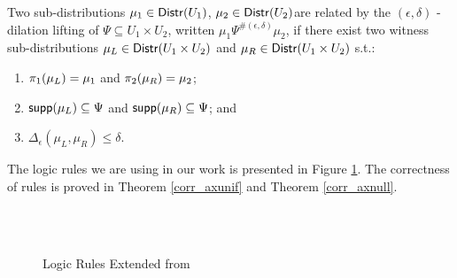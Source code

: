 \documentclass[a4paper,11pt]{article}
\begin{document}
\begin{defn}
Two sub-distributions $\mu_1 \in \mathsf{Distr}(U_1)$, $\mu_2 \in \mathsf{Distr}(U_2)$are
related by the $(\epsilon, \delta)$ - dilation lifting of $\Psi \subseteq U_1
\times U_2$, written $\mu_1 \Psi^{\#(\epsilon, \delta)} \mu_2$, if there exist
two witness sub-distributions $\mu_L \in \mathsf{Distr}(U_1 \times U_2)$ and $\mu_R \in
\mathsf{Distr}(U_1 \times U_2)$ s.t.:
\begin{enumerate}
	\item $\pi_1(\mu_L) = \mu_1$ and $\pi_2(\mu_R) = \mu_2$;
	\item $\mathsf{supp}(\mu_L) \subseteq \Psi$ and $\mathsf{supp}(\mu_R) \subseteq \Psi$; and
	\item $\Delta_{\epsilon}(\mu_L, \mu_R) \leq \delta$.
\end{enumerate}
\end{defn}

The logic rules we are using in our work is presented in Figure \ref{logic_rule}. The correctness of rules is proved in Theorem \ref{corr_axunif} and Theorem \ref{corr_axnull}.

\begin{figure}
\boxed{\vdash: \prog \times \prog \times \Psi \times \Psi}\\
\\
\caption{Logic Rules Extended from \cite{barthe2016proving}}
\label{logic_rule}
\end{figure}
\end{document}
